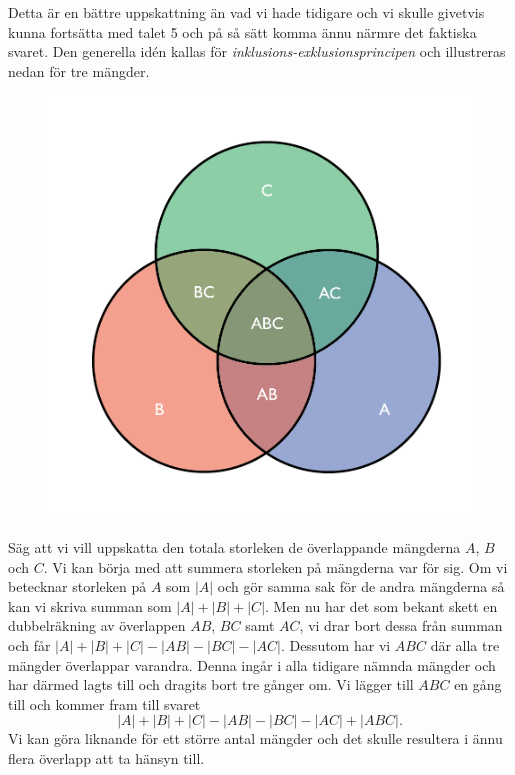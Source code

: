 Detta är en bättre uppskattning än vad vi hade tidigare och vi skulle givetvis kunna fortsätta med talet 5 och på så sätt komma ännu närmre det faktiska svaret.
Den generella idén kallas för \textit{inklusions-exklusionsprincipen} och illustreras nedan för tre mängder.
\begin{figure}[H]
    \centering
    \includegraphics[scale=0.3]{erik/Images/Venndiagram.pdf}
\end{figure}
Säg att vi vill uppskatta den totala storleken de överlappande mängderna $A$, $B$ och $C$. 
Vi kan börja med att summera storleken på mängderna var för sig.
Om vi betecknar storleken på $A$ som $|A|$ och gör samma sak för de andra mängderna så kan vi skriva summan som $|A|+|B|+|C|$.
Men nu har det som bekant skett en dubbelräkning av överlappen $AB$, $BC$ samt $AC$, vi drar bort dessa från summan och får $|A|+|B|+|C|-|AB|-|BC|-|AC|$.
Dessutom har vi $ABC$ där alla tre mängder överlappar varandra.
Denna ingår i alla tidigare nämnda mängder och har därmed lagts till och dragits bort tre gånger om. 
Vi lägger till $ABC$ en gång till och kommer fram till svaret
\begin{equation*}
    |A|+|B|+|C|-|AB|-|BC|-|AC|+|ABC|.
\end{equation*}
Vi kan göra liknande för ett större antal mängder och det skulle resultera i ännu flera överlapp att ta hänsyn till.

